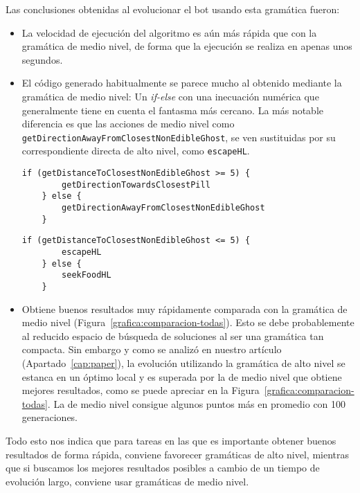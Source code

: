 Las conclusiones obtenidas al evolucionar el bot usando esta gramática fueron:
\begin{itemize}
\item La velocidad de ejecución del algoritmo es aún más rápida que con la gramática de medio nivel, de forma que la ejecución se realiza en apenas unos segundos.

\item El código generado habitualmente se parece mucho al obtenido mediante la gramática de medio nivel: Un \textit{if-else} con una inecuación numérica que generalmente tiene en cuenta el fantasma más cercano. La más notable diferencia es que las acciones de medio nivel como \texttt{getDirectionAwayFromClosestNonEdibleGhost}, se ven sustituidas por su correspondiente directa de alto nivel, como \texttt{escapeHL}.
\begin{lstlisting}[frame=single, breaklines=no, basicstyle=\fontsize{10}{11}\ttfamily, caption={Código del mejor individuo obtenido en una población evolucionada con la gramática de medio nivel.}, captionpos=b]
    if (getDistanceToClosestNonEdibleGhost >= 5) {
        getDirectionTowardsClosestPill
    } else {
        getDirectionAwayFromClosestNonEdibleGhost
    }
\end{lstlisting}

\begin{lstlisting}[frame=single, breaklines=no, basicstyle=\fontsize{10}{11}\ttfamily, caption={Código del mejor individuo obtenido en una población evolucionada con la gramática de alto nivel.}, captionpos=b]
    if (getDistanceToClosestNonEdibleGhost <= 5) {
        escapeHL
    } else {
        seekFoodHL
    }
\end{lstlisting}

\item Obtiene buenos resultados muy rápidamente comparada con la gramática de medio nivel (Figura~\ref{grafica:comparacion-todas}). Esto se debe probablemente al reducido espacio de búsqueda de soluciones al ser una gramática tan compacta. Sin embargo y como se analizó en nuestro artículo (Apartado~\ref{cap:paper}),  la evolución utilizando la gramática de alto nivel se estanca en un óptimo local y es superada por la de medio nivel que obtiene mejores resultados, como se puede apreciar en la Figura~\ref{grafica:comparacion-todas}. La de medio nivel consigue algunos puntos más en promedio con 100 generaciones.
\end{itemize}

Todo esto nos indica que para tareas en las que es importante obtener buenos resultados de forma rápida, conviene favorecer gramáticas de alto nivel, mientras que si buscamos los mejores resultados posibles a cambio de un tiempo de evolución largo, conviene usar gramáticas de medio nivel.

